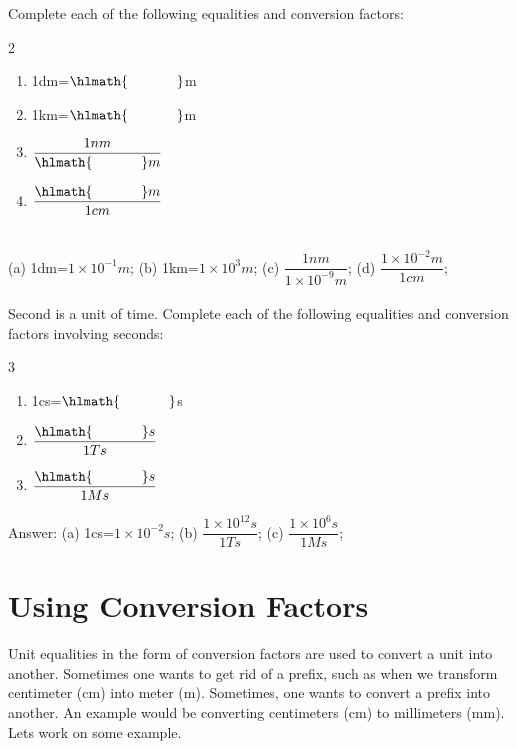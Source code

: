 \documentclass[main.tex]{subfiles}
\begin{document}
\begin{example} %
Complete each of the following equalities and conversion factors:

\begin{multicols}{2}
\begin{enumerate}[label=(\alph*)]
\item 1dm=$\hlmath{\hspace{35pt }}$m
\item 1km=$\hlmath{\hspace{35pt }}$m
\item  $\dfrac{1nm}{\hlmath{\hspace{35pt }}m}$
\item  $\dfrac{\hlmath{\hspace{35pt }}m}{1cm}$

\end{enumerate}
\end{multicols}
\\
(a) 1dm=$1\times10^{-1}m$; (b) 1km=$1\times10^{3}m$; (c) $\dfrac{1nm}{1\times10^{-9}m}$; (d) $\dfrac{1\times10^{-2}m}{1cm}$; 
\\
\faDiamond\ \\
Second is a unit of time. Complete each of the following equalities and conversion factors involving seconds:
\begin{multicols}{3}
\begin{enumerate}[label=(\alph*)]
\item 1cs=$\hlmath{\hspace{35pt }}$s
\item $\dfrac{\hlmath{\hspace{35pt }}s}{1Ts}$
\item $\dfrac{\hlmath{\hspace{35pt }}s}{1Ms}$
\end{enumerate}
\end{multicols}
\flushright Answer: (a) 1cs=$1\times10^{-2}s$; (b) $\dfrac{ 1\times10^{12} s}{1Ts}$; (c) $\dfrac{ 1\times10^{6} s}{1Ms}$;
\end{example}%




\section{Using Conversion Factors}


Unit equalities in the form of conversion factors are used to convert a unit into another. Sometimes one wants to get rid of a prefix, such as when we transform centimeter (cm) into meter (m). Sometimes, one wants to convert a prefix into another. An example would be converting centimeters (cm) to millimeters (mm). Let\textquotesingle s work on some example.
\end{document}
